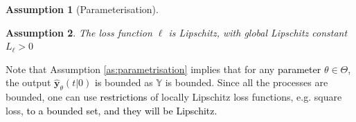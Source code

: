 \documentclass{ifacconf}
\def\rvq{{\mathbf{q}}}
\def\rvs{{\mathbf{s}}}
\def\rvv{{\mathbf{v}}}
\def\rvw{{\mathbf{w}}}
\def\rvy{{\mathbf{y}}}
\def\vs{{\bm{s}}}
\def\vv{{\bm{v}}}
\def\sS{{\mathbb{S}}}
\def\sW{{\mathbb{W}}}
\def\sY{{\mathbb{Y}}}
\newcommand{\reals}{\mathbb{R}}
\newtheorem{Assumption}{Assumption}[section]
\newcommand{\class}{\(\mathcal{SI}\)}
\begin{document}
\begin{Assumption}[Parameterisation]
 \end{Assumption}
 \begin{Assumption} \label{as:loss} The loss function $\ell$
is Lipschitz, with global Lipschitz constant $L_\ell>0$ %
\end{Assumption}
Note that Assumption \ref{as:parametrisation}
implies that for any \textcolor{black}{parameter}
$\theta \in \Theta$, 
the output $\hat{\rvy}_{\theta}(t|0)$ %
\textcolor{black}{is} bounded as $\mathbb{Y}$ is bounded.
Since all the processes are bounded, one can use \textcolor{black}{restrictions} of locally Lipschitz loss functions, e.g. square loss, 
\textcolor{black}{to a bounded set, and they will be Lipschitz.}
\end{document}
